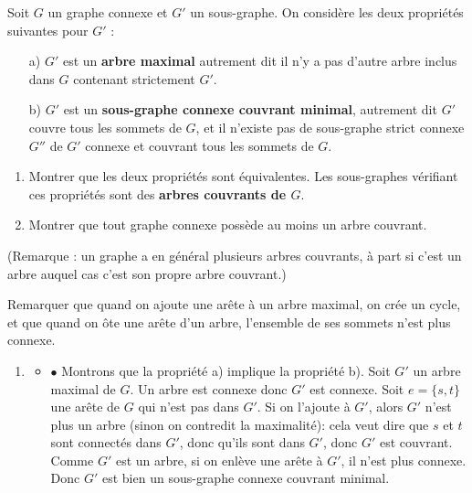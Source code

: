 \begin{exo}
Soit $G$ un graphe connexe et $G'$ un sous-graphe. On considère les deux propriétés suivantes pour $G'$ : 



\begin{itemize}
\item[a)]  $G'$ est un \textbf{arbre maximal} autrement dit il n'y a pas d'autre arbre inclus dans $G$ contenant strictement $G'$.
\item[b)] $G'$ est un \textbf{sous-graphe connexe couvrant minimal}, autrement dit $G'$ couvre tous les sommets de $G$, et il n'existe pas de sous-graphe strict connexe $G''$ de $G'$ connexe et couvrant tous les sommets de $G$. 
\end{itemize}

\begin{enumerate}
\item Montrer que les deux propriétés sont équivalentes. Les sous-graphes vérifiant ces propriétés sont des \textbf{arbres couvrants de $G$}.
\item Montrer que tout graphe connexe possède au moins un arbre couvrant.
\end{enumerate}


(Remarque : un graphe a en général plusieurs arbres couvrants, à part si c'est un arbre auquel cas c'est son propre arbre couvrant.)

\begin{hint}
Remarquer que quand on ajoute une arête à un arbre maximal, on crée un cycle, et que quand on ôte une arête d'un arbre, l'ensemble de ses sommets n'est plus connexe. 
\end{hint}


\begin{sol}
\begin{enumerate}
\item 
\begin{itemize}
\item $\bullet$ Montrons que la propriété a) implique la propriété b). Soit $G'$ un arbre maximal de $G$. Un arbre est connexe donc $G'$ est connexe. Soit $e=\{s,t\}$ une arête de $G$ qui n'est pas dans $G'$. Si on l'ajoute à $G'$, alors $G'$ n'est plus un arbre (sinon on contredit la maximalité): cela veut dire que $s$ et $t$ sont connectés dans $G'$,  donc qu'ils sont dans $G'$, donc $G'$ est couvrant. Comme $G'$ est un arbre, si on enlève une arête à $G'$, il n'est plus connexe. Donc $G'$ est bien un sous-graphe connexe couvrant minimal.


\end{itemize}
\end{enumerate}
\end{sol}
\end{exo}
